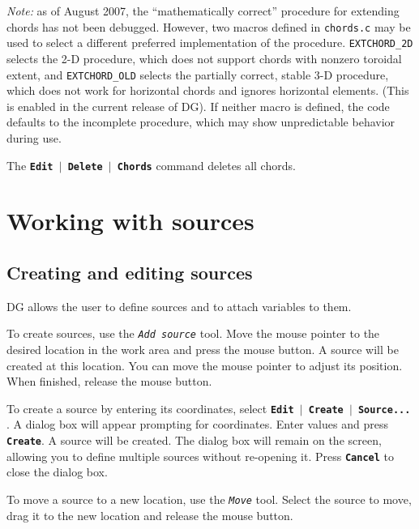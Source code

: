 \documentclass[12pt]{report}
\begin{document}
{\em Note:} as of August 2007, the ``mathematically correct'' procedure
for extending chords has not been debugged. However, two macros
defined in \texttt{chords.c} may be used to select a different preferred
implementation of the procedure.  \texttt{EXTCHORD\_2D} 
selects the 2-D
procedure, which does not support chords with nonzero
toroidal extent,
and \texttt{EXTCHORD\_OLD} selects the partially correct, stable
3-D procedure, which does not work for horizontal chords and ignores
horizontal elements. (This is enabled in the current
release of DG).
If neither macro is defined, the code defaults to
the incomplete procedure, which may show unpredictable behavior during
use.

The \textbf{\texttt{Edit $\mid$ Delete $\mid$ Chords}} command
deletes all chords.

\chapter{Working with sources}

\section{Creating and editing sources}

DG allows the user to define sources and to attach variables to them.

To create sources, use the \textit{\texttt{Add source}} tool. Move the
mouse pointer to the desired location in the work area and press the
mouse button. A source will be created at this location. You can move
the mouse pointer to adjust its position. When finished, release the
mouse button.

To create a source by entering its coordinates, select
\textbf{\texttt{Edit  \begin{math}\vert{}\end{math}  Create  \begin{math}\vert{}\end{math}  Source...}}
. A dialog box will appear prompting for coordinates. Enter values and
press \textbf{\texttt{Create}}. A source will be created. The dialog
box will remain on the screen, allowing you to define multiple sources
without re-opening it. Press \textbf{\texttt{Cancel}} to close the
dialog box.

To move a source to a new location, use the
\textit{\texttt{Move}} tool. Select the source to move, drag it
to the new location and release the mouse button.
\end{document}
